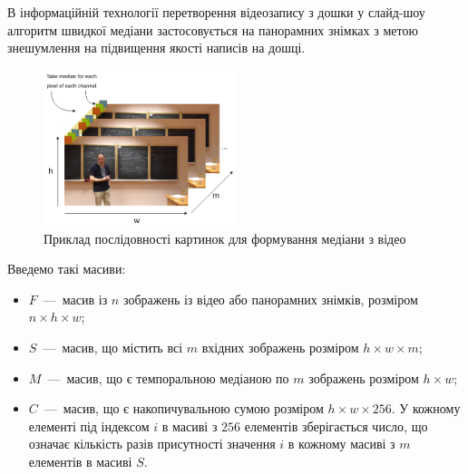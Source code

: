 В інформаційній технології перетворення відеозапису з дошки у слайд-шоу
\cite{bib:creating_slides_1} \cite{bib:patent_board}
алгоритм швидкої медіани застосовується на панорамних знімках
з метою знешумлення на підвищення якості написів на дошці.

\begin{figure}[H]
    \centering
    \includegraphics[width=0.5\textwidth]{images/median_seq}
    \caption{Приклад послідовності картинок для формування медіани з відео \cite{video:mmzi:yakovlev_numbers_theory}
        \label{fig:median_seq_example}
    }
\end{figure}

Введемо такі масиви:
\begin{itemize}
    \item $F$~---~масив із $n$ зображень із відео або панорамних знімків, розміром $n \times  h \times w$;
    \item $S$~---~масив, що містить  всі $m$ вхідних зображень розміром $h \times w \times m$;
    \item $M$~---~масив, що є темпоральною медіаною по $m$ зображень розміром $h \times w$;
    \item $C$~---~масив, що є накопичувальною сумою розміром $h \times w \times 256$. У кожному елементі під індексом $i$ в
          масиві з $256$ елементів зберігається число, що означає кількість разів присутності значення $i$ в кожному
          масиві з $m$ елементів в масиві $S$.
\end{itemize}

